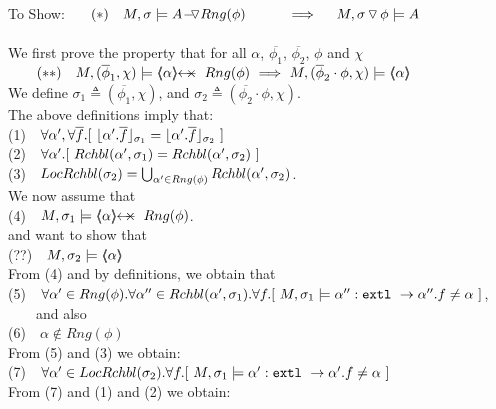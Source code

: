 $~$ \\
To Show: \ \ \  $(*)\ \ \ M, \sigma \models \PushASLong  {Rng(\phi)} {A}\  \ \ \ \ \  \ \ \    \Longrightarrow  \ \ \ \ M,  \PushSLong {\phi} {\sigma}   \models A$
\\ 
\SP \\
We first prove the property that for all $\alpha$,   $\overline {\phi_1}$, $\overline {\phi_2}$, $\phi$ and $\chi$\\
$\strut ~ \ \ \ \ \ (**)\ \ \    M, (\overline \phi_1,\chi) \models \protectedFrom \alpha {Rng(\phi)} \ \Longrightarrow \ M, (\overline \phi_2\cdot \phi,\chi) \models \inside \alpha$
\\
We define $\sigma_1 \triangleq (\overline {\phi_1},\chi)$, and  $\sigma_2 \triangleq (\overline {\phi_2}\cdot \phi,\chi) $.\\
The above definitions imply that: \\
\SP (1)\ \ $\forall \alpha',\forall \overline f.[\  \interpret {\sigma_1} {\alpha'.\overline f} =  \interpret {\sigma_2} {\alpha'.\overline f}\ ]$\\
\SP (2)\ \ $\forall \alpha'.[\  \Relevant {\alpha'} {\sigma_1} = \Relevant {\alpha'} {\sigma_2}\ ]$\\
\SP (3)\ \ $\LRelevantO {\sigma_2} = \bigcup_{\alpha'\in Rng(\phi)} \Relevant {\alpha'} {\sigma_2} $.\\
We now assume that\\
\SP (4)\ \ $M, \sigma_1 \models \protectedFrom \alpha {Rng(\phi)}$.\\
and want to show that\\
\SP (??)\ \ $M, \sigma_2 \models \inside \alpha$\\
From (4) and  by definitions, we obtain that\\
\SP (5)\ \ $\forall \alpha'\in Rng(\phi).\forall \alpha''\in \Relevant {\alpha'} {\sigma_1}.\forall f.[ \   M, \sigma_1 \models \alpha'':\prg{extl}\ \rightarrow \alpha''.f  \neq \alpha\ ]$, \ \ \ \ and also\\
\SP (6)\ \ $\alpha \notin Rng(\phi)$\\
From (5) and (3) we obtain:\\
\SP (7)\ \  $\forall \alpha' \in \LRelevantO {\sigma_2}.\forall f.[ \   M, \sigma_1 \models \alpha':\prg{extl}\ \rightarrow \alpha'.f  \neq \alpha\ ]$\\
From (7) and (1) and (2) we obtain:\\
